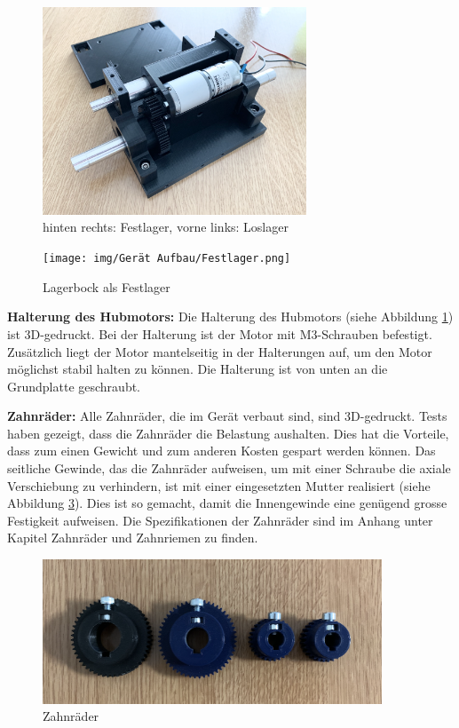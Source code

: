 \begin{figure}[H]
  \includegraphics[width=0.7\textwidth]{img/Gerät Aufbau/Lagerböcke.png}
  \centering
  \caption{hinten rechts: Festlager, vorne links: Loslager}
  \label{fig:Lagerung}
\end{figure}

\begin{figure}[H]
  \texttt{[image: img/Gerät Aufbau/Festlager.png]}
  \centering
  \caption{Lagerbock als Festlager}
  \label{fig:Festlager}
\end{figure}

\newpage

\textbf{Halterung des Hubmotors:} Die Halterung des Hubmotors (siehe Abbildung \ref{fig:Lagerung}) ist 3D-gedruckt. Bei der Halterung ist der Motor mit M3-Schrauben befestigt. Zusätzlich liegt der Motor mantelseitig in der Halterungen auf, um den Motor möglichst stabil halten zu können. Die Halterung ist von unten an die Grundplatte geschraubt.

\textbf{Zahnräder:} Alle Zahnräder, die im Gerät verbaut sind, sind 3D-gedruckt. Tests haben gezeigt, dass die Zahnräder die Belastung aushalten. Dies hat die Vorteile, dass zum einen Gewicht und zum anderen Kosten gespart werden können. Das seitliche Gewinde, das die Zahnräder aufweisen, um mit einer Schraube die axiale Verschiebung zu verhindern, ist mit einer eingesetzten Mutter realisiert (siehe Abbildung \ref{fig:Zahnräder}). Dies ist so gemacht, damit die Innengewinde eine genügend grosse Festigkeit aufweisen. Die Spezifikationen der Zahnräder sind im Anhang unter Kapitel Zahnräder und Zahnriemen zu finden.

\begin{figure}[H]
  \includegraphics[width=0.9\textwidth]{img/Gerät Aufbau/Zahnräder.png}
  \centering
  \caption{Zahnräder}
  \label{fig:Zahnräder}
\end{figure}

